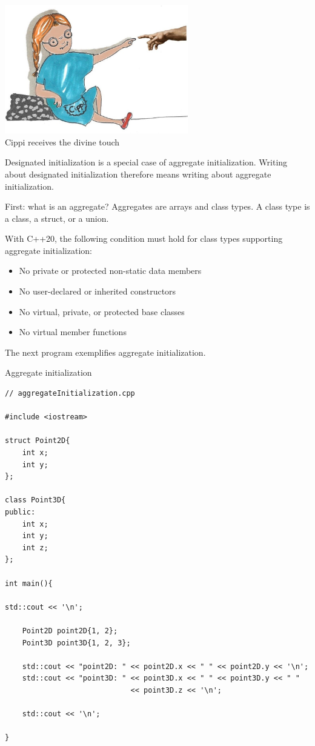 
\begin{center}
\includegraphics[width=0.6\textwidth]{content/3/chapter4/images/31.png}\\
Cippi receives the divine touch
\end{center}

Designated initialization is a special case of aggregate initialization. Writing about designated initialization therefore means writing about aggregate initialization.


First: what is an aggregate? Aggregates are arrays and class types. A class type is a class, a struct, or a union.

With C++20, the following condition must hold for class types supporting aggregate initialization:

\begin{itemize}
\item 
No private or protected non-static data members

\item 
No user-declared or inherited constructors

\item 
No virtual, private, or protected base classes

\item 
No virtual member functions
\end{itemize}

The next program exemplifies aggregate initialization.

\noindent
Aggregate initialization
\begin{lstlisting}[style=styleCXX]
// aggregateInitialization.cpp

#include <iostream>

struct Point2D{
	int x;
	int y;
};

class Point3D{
public:
	int x;
	int y;
	int z;
};

int main(){

std::cout << '\n';

	Point2D point2D{1, 2};
	Point3D point3D{1, 2, 3};
	
	std::cout << "point2D: " << point2D.x << " " << point2D.y << '\n';
	std::cout << "point3D: " << point3D.x << " " << point3D.y << " "
							 << point3D.z << '\n';
	
	std::cout << '\n';

}
\end{lstlisting}

